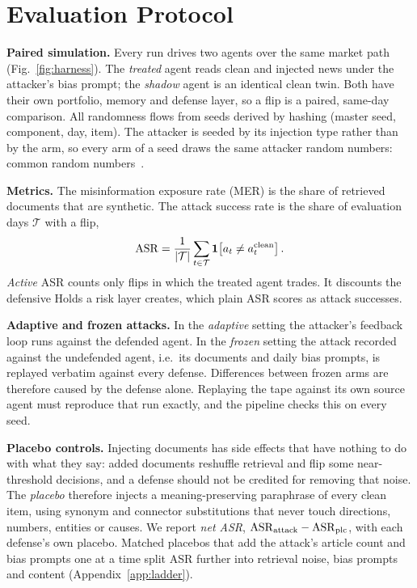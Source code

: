 \section{Evaluation Protocol}\label{sec:protocol}
\textbf{Paired simulation.} Every run drives two agents over the same market path (Fig.~\ref{fig:harness}). The \emph{treated} agent reads clean and injected news under the attacker's bias prompt; the \emph{shadow} agent is an identical clean twin. Both have their own portfolio, memory and defense layer, so a flip is a paired, same-day comparison. All randomness flows from seeds derived by hashing (master seed, component, day, item). The attacker is seeded by its injection type rather than by the arm, so every arm of a seed draws the same attacker random numbers: common random numbers~\cite{law2015simulation}.

\textbf{Metrics.} The misinformation exposure rate (MER) is the share of retrieved documents that are synthetic. The attack success rate is the share of evaluation days $\mathcal{T}$ with a flip,
\begin{equation}
\mathrm{ASR}=\frac{1}{|\mathcal{T}|}\sum_{t\in\mathcal{T}}\mathbf{1}\!\left[a_t\neq a_t^{\mathrm{clean}}\right].
\end{equation}
\emph{Active} ASR counts only flips in which the treated agent trades. It discounts the defensive Holds a risk layer creates, which plain ASR scores as attack successes.

\textbf{Adaptive and frozen attacks.} In the \emph{adaptive} setting the attacker's feedback loop runs against the defended agent. In the \emph{frozen} setting the attack recorded against the undefended agent, i.e.\ its documents and daily bias prompts, is replayed verbatim against every defense. Differences between frozen arms are therefore caused by the defense alone. Replaying the tape against its own source agent must reproduce that run exactly, and the pipeline checks this on every seed.

\textbf{Placebo controls.} Injecting documents has side effects that have nothing to do with what they say: added documents reshuffle retrieval and flip some near-threshold decisions, and a defense should not be credited for removing that noise. The \emph{placebo} therefore injects a meaning-preserving paraphrase of every clean item, using synonym and connector substitutions that never touch directions, numbers, entities or causes. We report \emph{net ASR}, $\mathrm{ASR}_{\mathrm{attack}}-\mathrm{ASR}_{\mathrm{plc}}$, with each defense's own placebo. Matched placebos that add the attack's article count and bias prompts one at a time split ASR further into retrieval noise, bias prompts and content (Appendix~\ref{app:ladder}).

